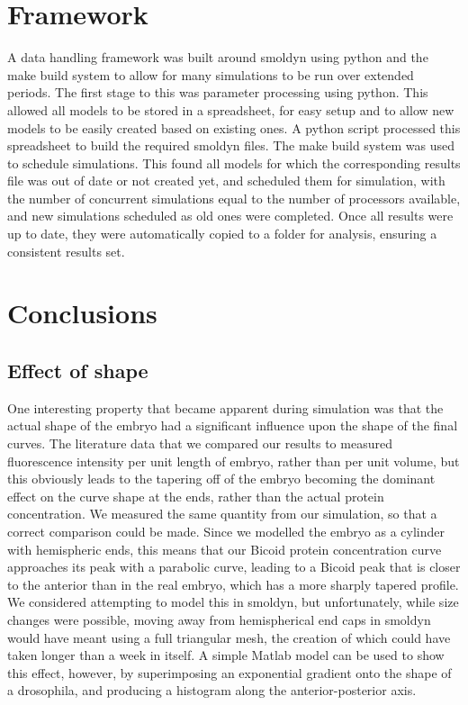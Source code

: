 \documentclass[11pt,a4paper,twocolumn]{article}
\begin{document}
\section{Framework}
A data handling framework was built around smoldyn using python and the make build system to allow for many simulations to be run over extended periods. The first stage to this was parameter processing using python. This allowed all models to be stored in a spreadsheet, for easy setup and to allow new models to be easily created based on existing ones. A python script processed this spreadsheet to build the required smoldyn files. The make build system was used to schedule simulations. This found all models for which the corresponding results file was out of date or not created yet, and scheduled them for simulation, with the number of concurrent simulations equal to the number of processors available, and new simulations scheduled as old ones were completed. Once all results were up to date, they were automatically copied to a folder for analysis, ensuring a consistent results set.
\section{Conclusions}
\subsection{Effect of shape}
One interesting property that became apparent during simulation was that the actual shape of the embryo had a significant influence upon the shape of the final curves. The literature data that we compared our results to measured fluorescence intensity per unit length of embryo, rather than per unit volume, but this obviously leads to the tapering off of the embryo becoming the dominant effect on the curve shape at the ends, rather than the actual protein concentration. We measured the same quantity from our simulation, so that a correct comparison could be made. Since we modelled the embryo as a cylinder with hemispheric ends, this means that our Bicoid protein concentration curve approaches its peak with a parabolic curve, leading to a Bicoid peak that is closer to the anterior than in the real embryo, which has a more sharply tapered profile.
We considered attempting to model this in smoldyn, but unfortunately, while size changes were possible, moving away from hemispherical end caps in smoldyn would have meant using a full triangular mesh, the creation of which could have taken longer than a week in itself. A simple Matlab model can be used to show this effect, however, by superimposing an exponential gradient onto the shape of a drosophila, and producing a histogram along the anterior-posterior axis.


\end{document}
